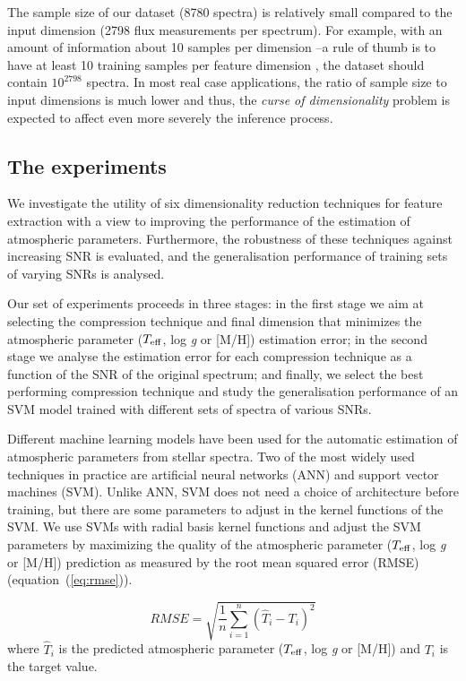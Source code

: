 \documentclass[a4paper,fleqn,usenatbib]{mnras}
\begin{document}
The sample size of our dataset (8780 spectra) is relatively
small compared to the input dimension (2798 flux measurements
per spectrum). For example, with an amount of information 
about 10 samples per dimension --a rule of thumb is to have at 
least 10 training samples per feature dimension \citep{jain:00}, 
the dataset should contain $10^{2798}$ spectra.
In most real case applications, the ratio of sample size to input 
dimensions is much lower and thus, the \textit{curse of dimensionality} 
problem is expected to affect even more severely the inference process. 


\subsection{The experiments}
\label{sec:modelling}

We investigate the utility of six dimensionality reduction techniques
for feature extraction with a view to improving the performance of the
estimation of atmospheric parameters. Furthermore, the robustness of
these techniques against increasing SNR is evaluated, and the
generalisation performance of training sets of varying SNRs is
analysed.

Our set of experiments proceeds in three stages: in the first stage we
aim at selecting the compression technique and final dimension that
minimizes the atmospheric parameter ($T_{\rm eff}$, log \textit{g} or
[M/H]) estimation error; in the second stage we analyse the estimation
error for each compression technique as a function of the SNR of the
original spectrum; and finally, we select the best performing
compression technique and study the generalisation performance of an
SVM model trained with different sets of spectra of various SNRs.

Different machine learning models have been used for the automatic
estimation of atmospheric parameters from stellar spectra. Two of the
most widely used techniques in practice are artificial neural networks
(ANN) and support vector machines (SVM). Unlike ANN, SVM does not need
a choice of architecture before training, but there are some
parameters to adjust in the kernel functions of the SVM. We use SVMs
with radial basis kernel functions and adjust the SVM parameters by
maximizing the quality of the atmospheric parameter ($T_{\rm eff}$,
log \textit{g} or [M/H]) prediction as measured by the root mean
squared error (RMSE) (equation~(\ref{eq:rmse})).

\begin{equation}
\label{eq:rmse}
RMSE=\sqrt{\frac{1}{n}\sum_{i=1}^{n}\left(\hat{T}_{i}-T_{i}\right)^{2}}
\end{equation}
where $\hat{T}_{i}$ is the predicted atmospheric parameter ($T_{\rm eff}$, 
  log \textit{g} or [M/H]) and $T_{i}$ is the target value. 
  
\end{document}
